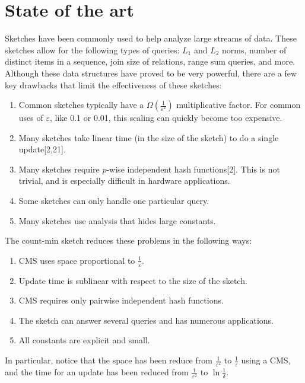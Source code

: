 \documentclass[11pt]{article}
\begin{document}
\section{State of the art}
Sketches have been commonly used to help analyze large streams of data. These sketches allow for the following types of queries: $L_1$ and $L_2$ norms, number of distinct items in a sequence, join size of relations, range sum queries, and more. Although these data structures have proved to be very powerful, there are a few key drawbacks that limit the effectiveness of these sketches:
\begin{enumerate}
    \item Common sketches typically have a $\Omega(\frac{1}{\varepsilon^2})$ multiplicative factor. For common uses of $\varepsilon$, like 0.1 or 0.01, this scaling can quickly become too expensive.
    \item Many sketches take linear time (in the size of the sketch) to do a single update[2,21]. 
    \item Many sketches require $p$-wise independent hash functions[2]. This is not trivial, and is especially difficult in hardware applications.
    \item Some sketches can only handle one particular query.
    \item Many sketches use analysis that hides large constants.
\end{enumerate}
The count-min sketch reduces these problems in the following ways:
\begin{enumerate}
    \item CMS uses space proportional to $\frac{1}{\varepsilon}$.
    \item Update time is sublinear with respect to the size of the sketch.
    \item CMS requires only pairwise independent hash functions.
    \item The sketch can answer several queries and has numerous applications.
    \item All constants are explicit and small.
\end{enumerate}
In particular, notice that the space has been reduce from $\frac{1}{\varepsilon^2}$ to $\frac{1}{\varepsilon}$ using a CMS, and the time for an update has been reduced from $\frac{1}{\varepsilon^2}$ to $\ln{\frac{1}{\delta}}$.
\end{document}
